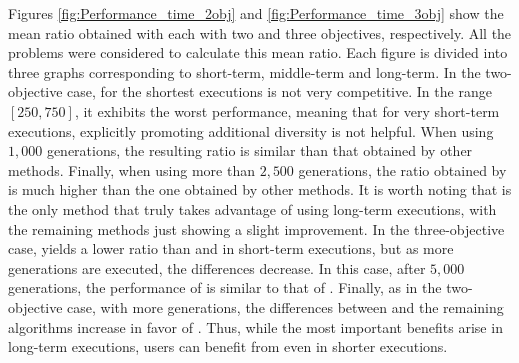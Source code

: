 Figures \ref{fig:Performance_time_2obj} and \ref{fig:Performance_time_3obj} show the mean \HV{} ratio obtained with each \MOEA{} with two and three objectives, respectively.
%
All the problems were considered to calculate this mean ratio.
%
Each figure is divided into three graphs corresponding to short-term, middle-term and long-term.
%
In the two-objective case, for the shortest executions \VSDMOEA{} is not very competitive.
%
In the range $[250, 750]$, it exhibits the worst performance, meaning that for very short-term executions,
explicitly promoting additional diversity is not helpful.
%
When using $1,000$ generations, the resulting \HV{} ratio is similar than that obtained by other methods.
%
Finally, when using more than $2,500$ generations, the \HV{} ratio obtained by \VSDMOEA{} is much higher than the one
obtained by other methods.
%
It is worth noting that \VSDMOEA{} is the only method that truly takes advantage of using long-term executions,
with the remaining methods just showing a slight improvement.
%
In the three-objective case, \VSDMOEA{} yields a lower \HV{} ratio than \RMOEA{} and \MOEAD{} in short-term executions,
but as more generations are executed, the differences decrease.
%
In this case, after $5,000$ generations, the performance of \VSDMOEA{} is similar to that of \RMOEA{}.
%
Finally, as in the two-objective case, with more generations, the differences between \VSDMOEA{} and the remaining
algorithms increase in favor of \VSDMOEA{}.
%
Thus, while the most important benefits arise in long-term executions, users can benefit from \VSDMOEA{} even in shorter executions.


